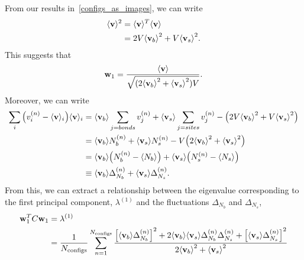 \documentclass[../main.tex]{subfiles}
\begin{document}
From our results in~\ref{configs_as_images}, we can write
%
\begin{align}
    \langle \mathbf{v}\rangle^2
    &= \langle \mathbf{v}\rangle^{T} \langle \mathbf{v}\rangle \\
    &= 2V{\langle \mathbf{v}_b\rangle}^2 + V {\langle \mathbf{v}_s\rangle}^2.
\end{align}
%
This suggests that
%
\begin{equation}
    \mathbf{w}_1 = \frac{\langle \mathbf{v}\rangle}{\sqrt{(2{\langle \mathbf{v}_b\rangle}^2 +
    {\langle \mathbf{v}_s\rangle}^2)V}}.
\end{equation}
%
Moreover, we can write
%
\begin{align}
  \sum_i {\left(v_{i}^{(n)} - \langle\mathbf{v}\rangle_i \right)}
    \langle\mathbf{v}\rangle_{i}
       &= {{\langle \mathbf{v}_b\rangle}\sum_{j=bonds}v_{j}^{(n)}
         +{\langle \mathbf{v}_s\rangle}\sum_{j=sites}v_j^{(n)}
         -\left(2V{\langle \mathbf{v}_b\rangle}^2+V {\langle \mathbf{v}_s\rangle}^2\right)}\\
       &= {\langle \mathbf{v}_b\rangle} N_b^{(n)}+{\langle \mathbf{v}_s\rangle} N_{s}^{(n)}
         -V{\left(2{\langle \mathbf{v}_b\rangle}^2+{\langle \mathbf{v}_s\rangle}^2\right)}\\
       &= {\langle \mathbf{v}_b\rangle}{\left(N_b^{(n)}-\langle N_b\rangle\right)}
         +{\langle \mathbf{v}_s\rangle}{\left(N_s^{(n)}-\langle N_s\rangle\right)}\\
       &\equiv {\langle \mathbf{v}_b\rangle} \Delta_{N_b}^{(n)} + {\langle \mathbf{v}_s\rangle} \Delta_{N_s}^{(n)}.
\end{align}
%
From this, we can extract a relationship between the eigenvalue corresponding
to the first principal component, $\lambda^{(1)}$ and the fluctuations
$\Delta_{N_b}$ and $\Delta_{N_s}$,
%
\begin{align*}
    \mathbf{w}_1^{T} C \mathbf{w}_1
        &= \lambda^{(1)}\\
        &= \frac{1}{N_{\mathrm{configs}}}\sum_{n=1}^{N_{\mathrm{configs}}} \frac{%
          {\left[\bondavg \Delta_{N_b}^{(n)}\right]}^2 + 2\bondavg \siteavg \Delta_{N_b}^{(n)} \Delta_{N_s}^{(n)}
        + {\left[\siteavg \Delta_{N_s}^{(n)}\right]}^2 }{2\bondavg^2 + \siteavg^2}
\end{align*}
%
\end{document}
